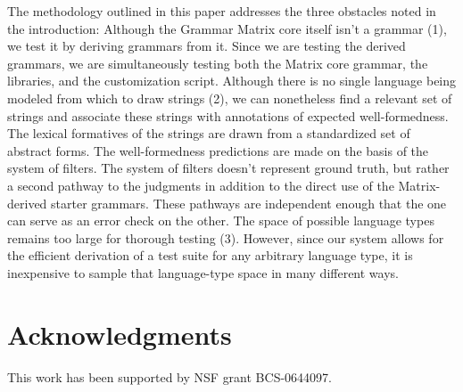 \documentclass[11pt]{article}
\begin{document}
The methodology outlined in this paper addresses the three obstacles
noted in the introduction:  Although the Grammar Matrix core
itself isn't a grammar (1), we test it by deriving grammars from it. Since we
are testing the derived grammars, we are simultaneously testing both
the Matrix core grammar, the libraries, and the customization script.
Although there is no single language being modeled from which to
draw strings (2), we can nonetheless find a relevant set of strings and
associate these strings with annotations of expected well-formedness.  The
lexical formatives of the strings are drawn from a standardized set
of abstract forms.  The well-formedness predictions are made on the basis
of the system of filters.  The system of filters doesn't represent
ground truth, but rather a second pathway to the judgments in 
addition to the direct use of the Matrix-derived starter grammars.
These pathways are independent enough that the one can serve as an
error check on the other.  The space of possible language types
remains too large for thorough testing (3).  However, since our system allows
for the efficient derivation of a test suite for any arbitrary
language type, it is inexpensive to sample that language-type space in
many different ways.






\section*{Acknowledgments}

This work has been supported by NSF grant BCS-0644097.  




\end{document}
